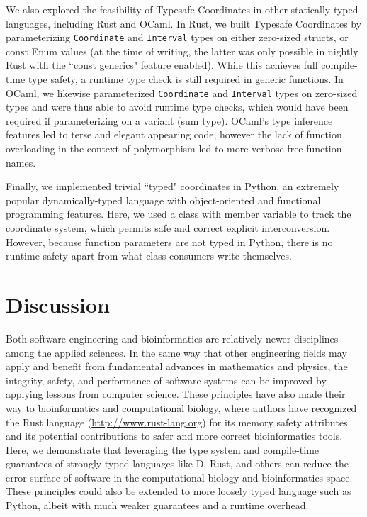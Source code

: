 \documentclass[12pt]{article}
\begin{document}
We also explored the feasibility of Typesafe Coordinates in other statically-typed languages, including Rust and OCaml. In Rust, we built Typesafe Coordinates by parameterizing \texttt{Coordinate} and \texttt{Interval} types on either zero-sized structs, or const Enum values (at the time of writing, the latter was only possible in nightly Rust with the ``const generics" feature enabled). While this achieves full compile-time type safety, a runtime type check is still required in generic functions. In OCaml, we likewise parameterized \texttt{Coordinate} and \texttt{Interval} types on zero-sized types and were thus able to avoid runtime type checks, which would have been required if parameterizing on a variant (sum type). OCaml's type inference features led to terse and elegant appearing code, however the lack of function overloading in the context of polymorphism led to more verbose free function names.

Finally, we implemented trivial ``typed" coordinates in Python, an extremely popular dynamically-typed language with object-oriented and functional programming features. Here, we used a class with member variable to track the coordinate system, which permits safe and correct explicit interconversion. However, because function parameters are not typed in Python, there is no runtime safety apart from what class consumers write themselves.

\section*{Discussion}   %

Both software engineering and bioinformatics are relatively newer disciplines among the applied sciences. In the same way that other engineering fields may apply and benefit from fundamental advances in mathematics and physics, the integrity, safety, and performance of software systems can be improved by applying lessons from computer science. These principles have also made their way to bioinformatics and computational biology, where authors have recognized the Rust language (\href{http://www.rust-lang.org}{http://www.rust-lang.org}) for its memory safety attributes and its potential contributions to safer and more correct bioinformatics tools.\cite{koster_rust-bio_2016,perkel_why_2020}  Here, we demonstrate that leveraging the type system and compile-time guarantees of strongly typed languages like D, Rust, and others can reduce the error surface of software in the computational biology and bioinformatics space. These principles could also be extended to more loosely typed language such as Python, albeit with much weaker guarantees and a runtime overhead.
\end{document}
